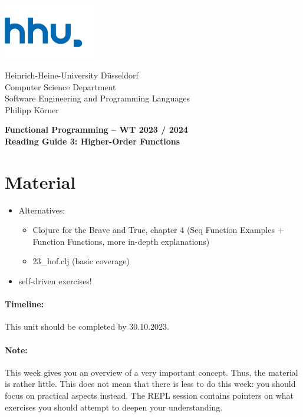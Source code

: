 \documentclass[11pt,a4paper]{article}
\begin{document}
\begin{minipage}[b]{\textwidth}
	\parbox[t]{5cm}{%
		\includegraphics[width=4cm]{unilogo}
		\hfill
	}
	\parbox[b]{11cm}{%
		Heinrich-Heine-University D\"usseldorf\\
		Computer Science Department\\
		Software Engineering and Programming Languages\\
		Philipp K\"orner
	}
\end{minipage}
\begin{center}
	\bf
	Functional Programming -- WT 2023 / 2024\\
	Reading Guide 3: Higher-Order Functions
\end{center}

\pagestyle{empty}

\section{Material} 

\begin{itemize}
    \item Alternatives:
        \begin{itemize}
            \item Clojure for the Brave and True, chapter 4 (Seq Function Examples + Function Functions, more in-depth explanations)
            \item 23\_hof.clj (basic coverage)
        \end{itemize}
    \item self-driven exercises!
\end{itemize}

\paragraph{Timeline:} This unit should be completed by 30.10.2023.

\paragraph{Note:} This week gives you an overview of a very important concept.
Thus, the material is rather little.
This does not mean that there is less to do this week: you should focus on practical aspects instead.
The REPL session contains pointers on what exercises you should attempt to deepen your understanding.
\end{document}
